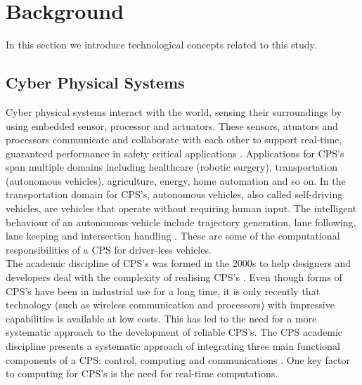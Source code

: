 \chapter{Background} \label{sect:background} 
In this section we introduce technological concepts related to this study.
\section{Cyber Physical Systems}

Cyber physical systems interact with the world, sensing their surroundings by using embedded sensor, processor and actuators. These sensors, atuators and processors communicate and collaborate with each other to support real-time, guaranteed performance in safety critical applications \cite{sidcyber}. Applications for CPS's span multiple domains including healthcare (robotic surgery), transportation (autonomous vehicles), agriculture, energy, home automation and so on. In the transportation domain for CPS's, autonomous vehicles, also called self-driving vehicles, are vehicles that operate without requiring human input. The intelligent behaviour of an autonomous vehicle include trajectory generation, lane following, lane keeping and intersection handling \cite{sidcyber}. These are some of the computational responsibilities of a CPS for driver-less vehicles.\\ 

The academic discipline of CPS's was formed in the 2000s \cite{alur} to help designers and developers deal with the complexity of realising CPS's \cite{gonz}. Even though forms of CPS's have been in industrial use for a long time, it is only recently that technology (such as wireless communication and processors) with impressive capabilities is available at low costs. This has led to the need for a more systematic approach to the development of reliable CPS's. The CPS academic discipline presents a systematic approach of integrating three main functional components of a CPS: control, computing and communications \cite{alur}. One key factor to computing for CPS's is the need for real-time computations.\\

